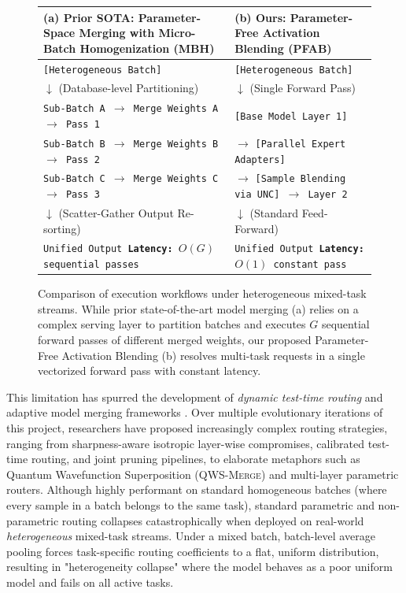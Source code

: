 \begin{figure}[t]
  \centering
  \small
  \setlength{\tabcolsep}{2pt}
  \begin{tabular}{p{} p{}}
    \textbf{(a) Prior SOTA: Parameter-Space Merging with Micro-Batch Homogenization (MBH)} & \textbf{(b) Ours: Parameter-Free Activation Blending (PFAB)} \\
    \midrule
    \texttt{[Heterogeneous Batch]} & \texttt{[Heterogeneous Batch]} \\
    \quad $\downarrow$ (Database-level Partitioning) & \quad $\downarrow$ (Single Forward Pass) \\
    \texttt{Sub-Batch A $\to$ Merge Weights A $\to$ Pass 1} & \texttt{[Base Model Layer 1]} \\
    \texttt{Sub-Batch B $\to$ Merge Weights B $\to$ Pass 2} & \quad $\to$ \texttt{[Parallel Expert Adapters]} \\
    \texttt{Sub-Batch C $\to$ Merge Weights C $\to$ Pass 3} & \quad $\to$ \texttt{[Sample Blending via UNC] $\to$ Layer 2} \\
    \quad $\downarrow$ (Scatter-Gather Output Re-sorting) & \quad $\downarrow$ (Standard Feed-Forward) \\
    \texttt{Unified Output \hfill \textbf{Latency:} $O(G)$ sequential passes} & \texttt{Unified Output \hfill \textbf{Latency:} $O(1)$ constant pass} \\
  \end{tabular}
  \caption{Comparison of execution workflows under heterogeneous mixed-task streams. While prior state-of-the-art model merging (a) relies on a complex serving layer to partition batches and executes $G$ sequential forward passes of different merged weights, our proposed Parameter-Free Activation Blending (b) resolves multi-task requests in a single vectorized forward pass with constant latency.}
  \label{fig:concept}
\end{figure}

This limitation has spurred the development of \emph{dynamic test-time routing} and adaptive model merging frameworks \cite{yang2023adamerging}. Over multiple evolutionary iterations of this project, researchers have proposed increasingly complex routing strategies, ranging from sharpness-aware isotropic layer-wise compromises, calibrated test-time routing, and joint pruning pipelines, to elaborate metaphors such as Quantum Wavefunction Superposition (\textsc{QWS-Merge}) \cite{qws2025} and multi-layer parametric routers. Although highly performant on standard homogeneous batches (where every sample in a batch belongs to the same task), standard parametric and non-parametric routing collapses catastrophically when deployed on real-world \emph{heterogeneous} mixed-task streams. Under a mixed batch, batch-level average pooling forces task-specific routing coefficients to a flat, uniform distribution, resulting in "heterogeneity collapse" where the model behaves as a poor uniform model and fails on all active tasks.

